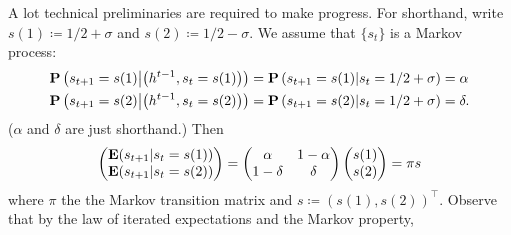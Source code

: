 \documentclass[11pt,letterpaper,reqno,oneside]{article}
\begin{document}
A lot technical preliminaries are required to make progress. For shorthand, write $s(1) \coloneqq 1/2 + \sigma$ and $s(2) \coloneqq 1/2 - \sigma$. We assume that $\{ s_t \}$ is a Markov process:
%
\begin{align*}
	\mathbf{P}\left( s_{t+1} = s(1) \middle| \bigl(h^{t-1}, s_t=s(1) \bigr) \right)
	&= \mathbf{P}\left( s_{t+1} = s(1) | s_t=1/2+\sigma \right) 
	= \alpha 
	\\
	\mathbf{P}\left( s_{t+1} = s(2) \middle| \bigl(h^{t-1}, s_t=s(2) \bigr) \right)
	&= \mathbf{P}\left( s_{t+1} = s(2) | s_t=1/2+\sigma \right) 
	= \delta .
\end{align*}
%
($\alpha$ and $\delta$ are just shorthand.) Then
%
\begin{equation*}
	\begin{pmatrix}
	\mathbf{E}(s_{t+1}|s_t=s(1)) \\
	\mathbf{E}(s_{t+1}|s_t=s(2))
	\end{pmatrix}
	=
	\begin{pmatrix}
	\alpha & 1-\alpha \\ 1-\delta & \delta
	\end{pmatrix}
	\begin{pmatrix}
	s(1) \\ s(2)
	\end{pmatrix}
	=
	\pi s 
\end{equation*}
%
where $\pi$ the the Markov transition matrix and $s \coloneqq \left( s(1), s(2) \right)^\top$. Observe that by the law of iterated expectations and the Markov property,
%
\end{document}
